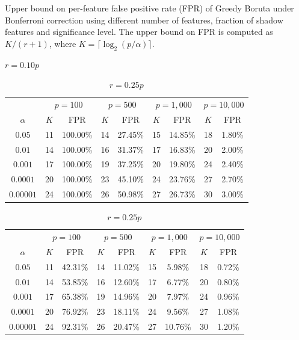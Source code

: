 \documentclass[runningheads]{llncs}
\begin{document}
\begin{table}[H]
\centering
\caption{Upper bound on per-feature false positive rate (FPR) of Greedy Boruta under Bonferroni correction using different number of features, fraction of shadow features and significance level. The upper bound on FPR is computed as $K/(r+1)$, where $K=\lceil \log_2(p/\alpha)\rceil$.}
\begin{subtable}{\textwidth}
\centering
\caption{$r = 0.10p$}
\begin{tabular}{c|cc|cc|cc|cc}
\toprule
& \multicolumn{2}{c|}{$p = 100$}
& \multicolumn{2}{c|}{$p = 500$}
& \multicolumn{2}{c|}{$p = 1{,}000$}
& \multicolumn{2}{c}{$p = 10{,}000$} \\
$\alpha$
& $K$ & FPR
& $K$ & FPR
& $K$ & FPR
& $K$ & FPR \\
\midrule
$0.05$    & 11 & 100.00\% & 14 & 27.45\% & 15 & 14.85\% & 18 & 1.80\% \\
$0.01$    & 14 & 100.00\% & 16 & 31.37\% & 17 & 16.83\% & 20 & 2.00\% \\
$0.001$   & 17 & 100.00\% & 19 & 37.25\% & 20 & 19.80\% & 24 & 2.40\% \\
$0.0001$  & 20 & 100.00\% & 23 & 45.10\% & 24 & 23.76\% & 27 & 2.70\% \\
$0.00001$ & 24 & 100.00\% & 26 & 50.98\% & 27 & 26.73\% & 30 & 3.00\% \\
\bottomrule
\end{tabular}
\end{subtable}


\begin{subtable}{\textwidth}
\centering
\caption{$r = 0.25p$}
\begin{tabular}{c|cc|cc|cc|cc}
\toprule
& \multicolumn{2}{c|}{$p = 100$}
& \multicolumn{2}{c|}{$p = 500$}
& \multicolumn{2}{c|}{$p = 1{,}000$}
& \multicolumn{2}{c}{$p = 10{,}000$} \\
$\alpha$
& $K$ & FPR
& $K$ & FPR
& $K$ & FPR
& $K$ & FPR \\
\midrule
$0.05$    & 11 & 42.31\% & 14 & 11.02\% & 15 & 5.98\% & 18 & 0.72\% \\
$0.01$    & 14 & 53.85\% & 16 & 12.60\% & 17 & 6.77\% & 20 & 0.80\% \\
$0.001$   & 17 & 65.38\% & 19 & 14.96\% & 20 & 7.97\% & 24 & 0.96\% \\
$0.0001$  & 20 & 76.92\% & 23 & 18.11\% & 24 & 9.56\% & 27 & 1.08\% \\
$0.00001$ & 24 & 92.31\% & 26 & 20.47\% & 27 & 10.76\% & 30 & 1.20\% \\
\bottomrule
\end{tabular}
\end{subtable}


\end{table}
\end{document}
